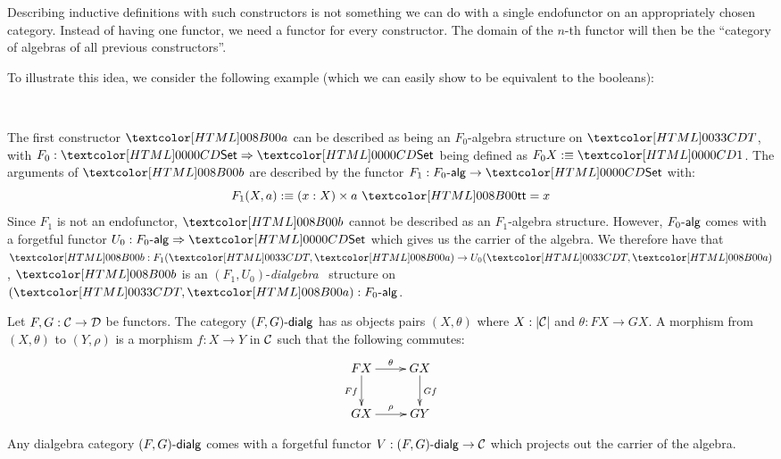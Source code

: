 Describing inductive definitions with such constructors is not
something we can do with a single endofunctor on an appropriately
chosen category. Instead of having one functor, we need a functor for
every constructor. The domain of the $n$-th functor will then be the
``category of algebras of all previous constructors''. 

\begin{example}
  \label{silly-type}
  To illustrate this idea, we consider the following example (which we
  can easily show to be equivalent to the booleans):
  \begin{datatype}{\Tty}{\Set}
    \constr{\Ta}{\unitty \to \Tty} \\
  \end{datatype}
\end{example}

The first constructor $\Ta$ can be described as being an $F_0$-algebra
structure on $\Tty$, with $F_0 : \Func{\Set}{\Set}$ being defined as
$F_0 X \ddefeq \unitty$. The arguments of $\Tb$ are described by the
functor $F_1 : \algcat{F_0} \to \Set$ with:
$$
F_1 (X,a) \ddefeq (x : X) \times a\ \unitval = x
$$
Since $F_1$ is not an endofunctor, $\Tb$ cannot be described as an
$F_1$-algebra structure. However, $\algcat{F_0}$ comes with a
forgetful functor $U_0 : \Func{\algcat{F_0}}{\Set}$ which gives us the
carrier of the algebra. We therefore have that
$\Tb : F_1(\Tty,\Ta) \to U_0(\Tty,\Ta)$, \ie $\Tb$ is an
$(F_1,U_0)$-\emph{dialgebra}~\cite{Hagino1987} structure on
$(\Tty,\Ta) : \algcat{F_0}$.
%
\begin{definition}
  \label{dialg}
  Let $F, G : \mathcal{C} \to \mathcal{D}$ be functors. The category $\dialgcat{F}{G}$ has
  as objects pairs $(X, \theta)$ where $X : |\mathcal{C}|$ and $\theta : F X \to
  G X$. A morphism from $(X, \theta)$ to $(Y, \rho)$ is a morphism $f : X
  \to Y$ in $\mathcal{C}$ such that the following commutes:
  $$
  \xymatrix{
  F X \ar[r]^{\theta} \ar[d]_{F f} &G X \ar[d]^{G f} \\
  G X \ar[r]^{\rho}  &G Y
  }
  $$
\end{definition}
%

\begin{remark}
  Any dialgebra category $\dialgcat{F}{G}$ comes with a forgetful
  functor $V : \dialgcat{F}{G} \to \Cc$ which projects out the carrier
  of the algebra.
\end{remark}


